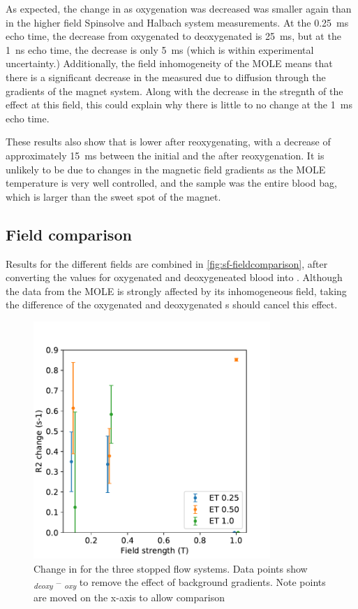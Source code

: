 As expected, the change in \Ttwo as oxygenation was decreased was smaller again than in the higher field Spinsolve and Halbach system measurements.
At the \SI{0.25}{ms} echo time, the decrease from oxygenated to deoxygenated is \SI{25}{ms}, but at the \SI{1}{ns} echo time, the decrease is only \SI{5}{ms} (which is within experimental uncertainty.)
Additionally, the field inhomogeneity of the MOLE means that there is a significant decrease in the measured \Ttwo due to diffusion through the gradients of the magnet system.
Along with the decrease in the stregnth of the effect at this field, this could explain why there is little to no change at the \SI{1}{ms} echo time.

These results also show that \Ttwo is lower after reoxygenating, with a decrease of approximately \SI{15}{ms} between the initial \Ttwo and the \Ttwo after reoxygenation.
It is unlikely to be due to changes in the magnetic field gradients as the MOLE temperature is very well controlled, and the sample was the entire blood bag, which is larger than the sweet spot of the magnet.

\subsection{Field comparison}
Results for the different fields are combined in \autoref{fig:sf-fieldcomparison}, after converting the \Ttwo values for oxygenated and deoxygeneated blood into \Rtwo.
Although the data from the MOLE is strongly affected by its inhomogeneous field, taking the difference of the oxygenated and deoxygenated \Rtwo{}s should cancel this effect.

\begin{figure}[h]
\centering
\includegraphics[width=0.8\textwidth]{figures/stoppedflow/fieldcomparison.pdf}
\caption[Change in \Rtwo for the three stopped flow systems]{Change in \Rtwo for the three stopped flow systems. Data points show \Rtwo\textsubscript{\textit{deoxy}} -- \Rtwo\textsubscript{\textit{oxy}} to remove the effect of background gradients. Note points are moved on the x-axis to allow comparison}
\label{fig:sf-fieldcomparison}
\end{figure}

